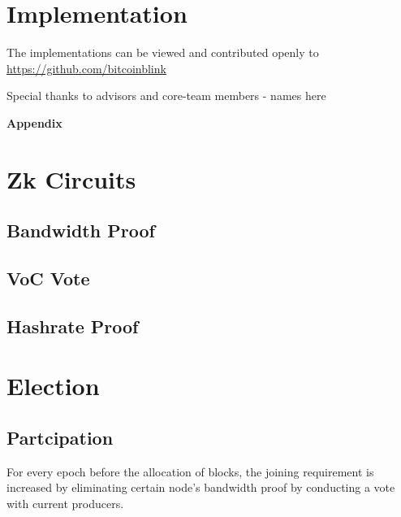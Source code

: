 \documentclass[a4paper,10pt]{article}
\begin{document}
\section{Implementation}
\noindent The implementations can be viewed and contributed openly to\\
\url{https://github.com/bitcoinblink}
\nocite{nakamoto2008bitcoin} \nocite{poon2016bitcoin}  \nocite{yakovenko2018solana} \nocite{wood2014ethereum}



\noindent Special thanks to advisors and core-team members - names here

\newpage
\appendix
\noindent \Large \textbf{Appendix}
\normalsize
\section{Zk Circuits}
\subsection{Bandwidth Proof}
\subsection{VoC Vote}
\subsection{Hashrate Proof}
\section{Election}

\subsection{Partcipation}

For every epoch before the allocation of blocks, the joining  requirement is increased by eliminating certain node's bandwidth proof by conducting a vote with current producers.
\end{document}
